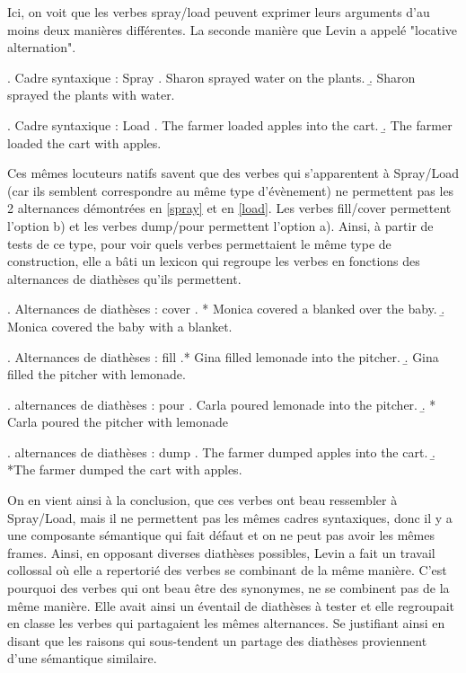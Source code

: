 Ici, on voit que les verbes spray/load peuvent exprimer leurs arguments d'au moins deux manières différentes. La seconde manière que Levin a appelé "locative alternation".

\ex. \label{spray} Cadre syntaxique : Spray
	\a. Sharon sprayed water on the plants.
	\b. Sharon sprayed the plants with water.
	
\ex. \label{load} Cadre syntaxique : Load
	\a. The farmer loaded apples into the cart.
	\b. The farmer loaded the cart with apples.
	
Ces mêmes locuteurs natifs savent que des verbes qui s'apparentent à Spray/Load (car ils semblent correspondre au même type d'évènement) ne permettent pas les 2 alternances démontrées en \ref{spray} et en \ref{load}. Les verbes fill/cover permettent l'option b) et les verbes dump/pour permettent l'option a). Ainsi, à partir de tests de ce type, pour voir quels verbes permettaient le même type de construction, elle a bâti un lexicon qui regroupe les verbes en fonctions des alternances  de diathèses qu'ils permettent.
	
\ex. \label{cover} Alternances de diathèses : cover
	\a. * Monica covered a blanked over the baby.
	\b. Monica covered the baby with a blanket.

\ex. \label{fill} Alternances de diathèses : fill
	\a.* Gina filled lemonade into the pitcher. 
	\b. Gina filled the pitcher with lemonade. 

\ex. \label{pour} alternances de diathèses : pour
	\a. Carla poured lemonade into the pitcher. 
	\b. * Carla poured the pitcher with lemonade

\ex. \label{dump} alternances de diathèses : dump
	\a. The farmer dumped apples into the cart. 
	\b. *The farmer dumped the cart with apples. 
	
On en vient ainsi à la conclusion, que ces verbes ont beau ressembler à Spray/Load, mais il ne permettent pas les mêmes cadres syntaxiques, donc il y a une composante sémantique qui fait défaut et on ne peut pas avoir les mêmes frames. Ainsi, en opposant diverses diathèses possibles, Levin a fait un travail collossal où elle a repertorié des verbes se combinant de la même manière. C'est pourquoi des verbes qui ont beau être des synonymes, ne se combinent pas de la même manière. Elle avait ainsi un éventail de diathèses à tester et elle regroupait en classe les verbes qui partagaient les mêmes alternances. Se justifiant ainsi en disant que les raisons qui sous-tendent un partage des diathèses proviennent d'une sémantique similaire. 


